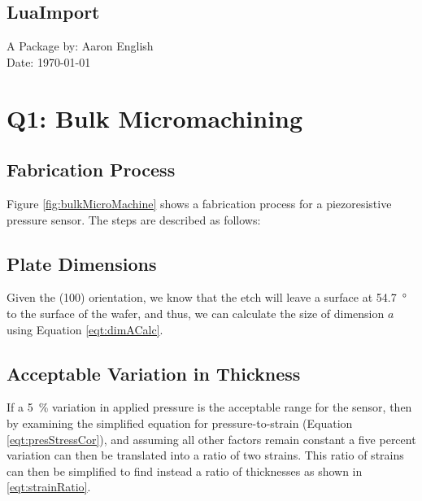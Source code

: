 \documentclass[hidelinks, 12pt]{article}%
\begin{document}
    \frontmatter
        \begin{center}
            \vspace*{1cm}
            \section*{\Huge LuaImport}%
            \vspace{6cm}
            \begin{centering}
                \Large{A Package by: Aaron English\\
                Date: \today}
            \end{centering}
        \end{center}
        \thispagestyle{empty}

    \clearpage
    \mainmatter
        \section{Q1: Bulk Micromachining}
            \subsection{Fabrication Process}
                Figure \ref{fig:bulkMicroMachine} shows a fabrication process for a piezoresistive
                pressure sensor.
                The steps are described as follows:

            \subsection{Plate Dimensions}
                Given the (100) orientation, we know that the etch will leave a surface at 
                \SI{54.7}{\degree} to the surface of the wafer, and thus, we can calculate the size
                of dimension $a$ using Equation \ref{eqt:dimACalc}.

            \subsection{Acceptable Variation in Thickness}
                If a \SI{5}{\percent} variation in applied pressure is the acceptable range for the
                sensor, then by examining the simplified equation for pressure-to-strain (Equation 
                \ref{eqt:presStressCor}), and assuming all other factors remain constant a five percent
                variation can then be translated into a ratio of two strains.
                This ratio of strains can then be simplified to find instead a ratio of 
                thicknesses as shown in \ref{eqt:strainRatio}.
\end{document}
